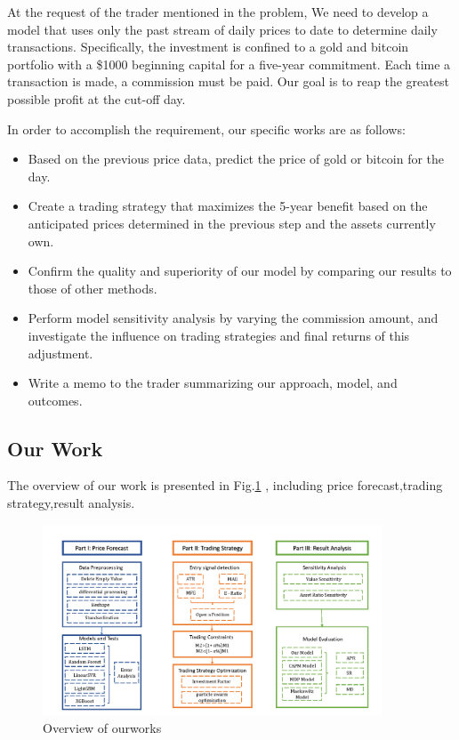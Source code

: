 \documentclass{mcmthesis}
\begin{document}
	At the request of the trader mentioned in the problem, We need to develop a model that uses only the past stream of daily prices to date to determine daily transactions. Specifically, the investment is confined to a gold and bitcoin portfolio with a \$1000 beginning capital for a five-year commitment. Each time a transaction is made, a commission must be paid. Our goal is to reap the greatest possible profit at the cut-off day.
	
	In order to accomplish the requirement, our specific works are as follows:
	\begin{itemize}		%
		\item Based on the previous price data, predict the price of gold or bitcoin for the day.
		\item Create a trading strategy that maximizes the 5-year benefit based on the anticipated prices determined in the previous step and the assets currently own.
		\item Confirm the quality and superiority of our model by comparing our results to those of other methods.
		\item Perform model sensitivity analysis by varying the commission amount, and investigate the influence on trading strategies and final returns of this adjustment.
		\item Write a memo to the trader summarizing our approach, model, and outcomes.
	\end{itemize}		

\subsection{Our Work}

The overview of our work is presented in Fig.\ref{fig:ourwork} , including price forecast,trading strategy,result analysis.

\begin{figure}[H]	%
	\centering
	\includegraphics[width=0.9\textwidth]{ourwork}	%
	\caption{Overview of ourworks} 
	\label{fig:ourwork}		%
\end{figure}
\end{document}
